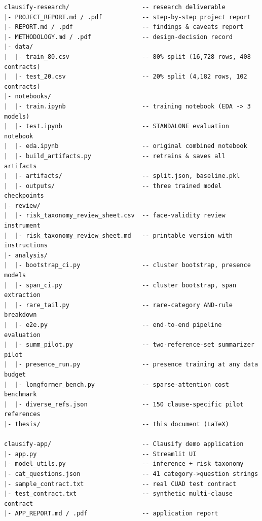 \begin{verbatim}
clausify-research/                    -- research deliverable
|- PROJECT_REPORT.md / .pdf           -- step-by-step project report
|- REPORT.md / .pdf                   -- findings & caveats report
|- METHODOLOGY.md / .pdf              -- design-decision record
|- data/
|  |- train_80.csv                    -- 80% split (16,728 rows, 408 contracts)
|  |- test_20.csv                     -- 20% split (4,182 rows, 102 contracts)
|- notebooks/
|  |- train.ipynb                     -- training notebook (EDA -> 3 models)
|  |- test.ipynb                      -- STANDALONE evaluation notebook
|  |- eda.ipynb                       -- original combined notebook
|  |- build_artifacts.py              -- retrains & saves all artifacts
|  |- artifacts/                      -- split.json, baseline.pkl
|  |- outputs/                        -- three trained model checkpoints
|- review/
|  |- risk_taxonomy_review_sheet.csv  -- face-validity review instrument
|  |- risk_taxonomy_review_sheet.md   -- printable version with instructions
|- analysis/
|  |- bootstrap_ci.py                 -- cluster bootstrap, presence models
|  |- span_ci.py                      -- cluster bootstrap, span extraction
|  |- rare_tail.py                    -- rare-category AND-rule breakdown
|  |- e2e.py                          -- end-to-end pipeline evaluation
|  |- summ_pilot.py                   -- two-reference-set summarizer pilot
|  |- presence_run.py                 -- presence training at any data budget
|  |- longformer_bench.py             -- sparse-attention cost benchmark
|  |- diverse_refs.json               -- 150 clause-specific pilot references
|- thesis/                            -- this document (LaTeX)

clausify-app/                         -- Clausify demo application
|- app.py                             -- Streamlit UI
|- model_utils.py                     -- inference + risk taxonomy
|- cat_questions.json                 -- 41 category->question strings
|- sample_contract.txt                -- real CUAD test contract
|- test_contract.txt                  -- synthetic multi-clause contract
|- APP_REPORT.md / .pdf               -- application report
\end{verbatim}
